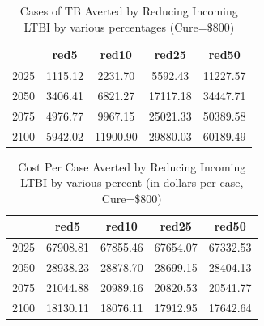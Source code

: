 \documentclass{amsart}
\begin{document}
\begin{table}
\centering
\begin{tabular}{|r|cccc|} \hline
       & red5    & red10    & red25    & red50    \\ \hline
  2025 & 1115.12 & 2231.70  & 5592.43  & 11227.57 \\ 
  2050 & 3406.41 & 6821.27  & 17117.18 & 34447.71 \\ 
  2075 & 4976.77 & 9967.15  & 25021.33 & 50389.58 \\ 
  2100 & 5942.02 & 11900.90 & 29880.03 & 60189.49 \\ 
   \hline
\end{tabular}
\caption{Cases of TB Averted by Reducing Incoming LTBI by various percentages
         (Cure=\$800)} 
\label{tab:caRed}
\end{table}

\begin{table}
\centering
\begin{tabular}{|r|cccc|} \hline
       & red5     & red10    & red25    & red50    \\ \hline
  2025 & 67908.81 & 67855.46 & 67654.07 & 67332.53 \\ 
  2050 & 28938.23 & 28878.70 & 28699.15 & 28404.13 \\ 
  2075 & 21044.88 & 20989.16 & 20820.53 & 20541.77 \\ 
  2100 & 18130.11 & 18076.11 & 17912.95 & 17642.64 \\ \hline
\end{tabular}
\caption{Cost Per Case Averted by Reducing Incoming LTBI by various percent (in
dollars per case, Cure=\$800)} 
\label{tab:cpcaRed}
\end{table}
\end{document}
